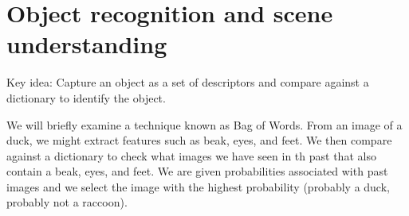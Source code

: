\documentclass[twoside]{article}
\begin{document}
%
%
%
%


\section{Object recognition and scene understanding}
Key idea: Capture an object as a set of descriptors and compare against a dictionary to identify the object.

We will briefly examine a technique known as Bag of Words. From an image of a duck, we might extract features such as beak, eyes, and feet. We then compare against a dictionary to check what images we have seen in th past that also contain a beak, eyes, and feet. We are given probabilities associated with past images and we select the image with the highest probability (probably a duck, probably not a raccoon).
\end{document}
